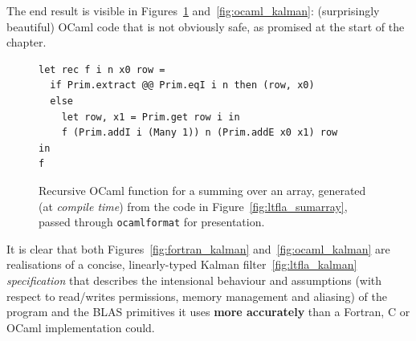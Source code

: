 The end result is visible in Figures~\ref{fig:ocaml_sumarray}
and~\ref{fig:ocaml_kalman}:  (surprisingly beautiful) OCaml code that is not
obviously safe, as promised at the start of the chapter.

\begin{figure}[tp]
    \centering
    \begin{verbatim}
let rec f i n x0 row =
  if Prim.extract @@ Prim.eqI i n then (row, x0)
  else
    let row, x1 = Prim.get row i in
    f (Prim.addI i (Many 1)) n (Prim.addE x0 x1) row
in
f
    \end{verbatim}
    \caption{Recursive OCaml function for a summing over an array, generated (at
        \emph{compile time}) from the code in Figure~\ref{fig:ltfla_sumarray},
        passed through \texttt{ocamlformat} for presentation.}\label{fig:ocaml_sumarray}

\end{figure}

It is clear that both Figures~\ref{fig:fortran_kalman}
and~\ref{fig:ocaml_kalman} are realisations of a concise, linearly-typed Kalman
filter~\ref{fig:ltfla_kalman} \emph{specification} that describes the intensional
behaviour and assumptions (with respect to read/writes permissions, memory
management and aliasing) of the program and the BLAS primitives it uses \textbf{more
accurately} than a Fortran, C or OCaml implementation could.

